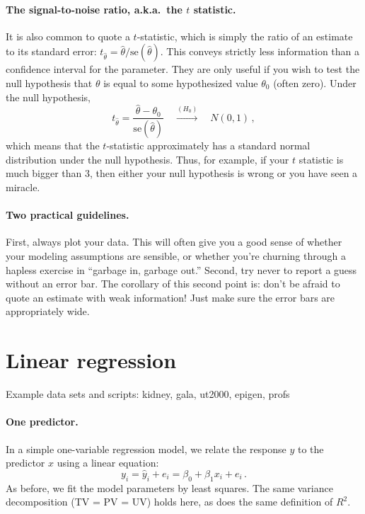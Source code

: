\documentclass[11pt]{article}
\newcommand{\1}[1]{\mathbf{1}_{\{ {#1} \}}}
\begin{document}
\paragraph{The signal-to-noise ratio, a.k.a.~the $t$ statistic.}  It is also common to quote a $t$-statistic, which is simply the ratio of an estimate to its standard error: $t_{\hat{\theta}} = \hat\theta / \mbox{se}(\hat{\theta})$.  This conveys strictly less information than a confidence interval for the parameter.  They are only useful if you wish to test the null hypothesis that $\theta$ is equal to some hypothesized value $\theta_0$ (often zero).  Under the null hypothesis,
$$
t_{\hat{\theta}} = \frac{\hat\theta -\theta_0} { \mbox{se}(\hat{\theta})} \quad \stackrel{(H_0)}{\longrightarrow} \quad N(0,1) \, ,
$$
which means that the $t$-statistic approximately has a standard normal distribution under the null hypothesis.  Thus, for example, if your $t$ statistic is much bigger than $3$, then either your null hypothesis is wrong or you have seen a miracle.

\paragraph{Two practical guidelines.}  First, always plot your data.  This will often give you a good sense of whether your modeling assumptions are sensible, or whether you're churning through a hapless exercise in ``garbage in, garbage out.''  Second, try never to report a guess without an error bar.  The corollary of this second point is: don't be afraid to quote an estimate with weak information!  Just make sure the error bars are appropriately wide.


\section{Linear regression}
Example data sets and scripts: kidney, gala, ut2000, epigen, profs

\paragraph{One predictor.}

In a simple one-variable regression model, we relate the response $y$ to the predictor $x$ using a linear equation:
$$
y_i = \hat{y}_i + e_i = \beta_0 + \beta_1 x_i + e_i \, .
$$
As before, we fit the model parameters by least squares.  The same variance decomposition (TV = PV = UV) holds here, as does the same definition of $R^2$.
\end{document}

